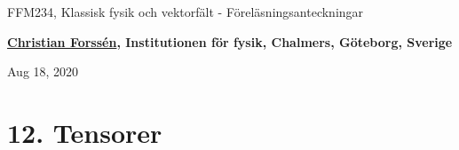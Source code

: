 \documentclass[%
oneside,                 %
final,                   %
10pt]{article}
\begin{document}

\newcommand{\exercisesection}[1]{\subsection*{#1}}







\thispagestyle{empty}

\begin{center}
{\LARGE\bf
\begin{spacing}{1.25}
FFM234, Klassisk fysik och vektorfält - Föreläsningsanteckningar
\end{spacing}
}
\end{center}


\begin{center}
{\bf \href{{http://fy.chalmers.se/subatom/tsp/}}{Christian Forssén}, Institutionen för fysik, Chalmers, Göteborg, Sverige${}^{}$} \\ [0mm]
\end{center}

\begin{center}
\end{center}
    

\begin{center}
Aug 18, 2020
\end{center}

\vspace{1cm}


\section*{12. Tensorer}
\end{document}
